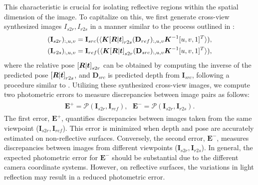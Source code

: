 This characteristic is crucial for isolating reflective regions within the spatial dimension of the image. To capitalize on this, we first generate cross-view synthesized images $I_{s2r}, I_{r2s}$ in a manner similar to the process outlined in :
\begin{align}
    (\mathbf{I}_{s2r})_{:, u, v} = \mathbf{I}_{src}(\langle {\displaystyle {\bm{K}}}{[{\displaystyle {\bm{R}}}|{\displaystyle {\bm{t}}}]}_{r2s} (\mathbf{D}_{ref})_{:,u,v} {\displaystyle {\bm{K}}}^{-1}[u,v,1]^{T}\rangle),\\
    (\mathbf{I}_{r2s})_{:, u, v} = \mathbf{I}_{ref}(\langle {\displaystyle {\bm{K}}}{[{\displaystyle {\bm{R}}}|{\displaystyle {\bm{t}}}]}_{s2r} (\mathbf{D}_{src})_{:,u,v} {\displaystyle {\bm{K}}}^{-1}[u,v,1]^{T}\rangle),
\end{align}
where the relative pose ${[{\displaystyle {\bm{R}}}|{\displaystyle {\bm{t}}}]}_{s2r}$ can be obtained by computing the inverse of the predicted pose ${[{\displaystyle {\bm{R}}}|{\displaystyle {\bm{t}}}]}_{r2s}$, and $\mathbf{D}_{src}$ is predicted depth from $\mathbf{I}_{src}$, following a procedure similar to .
Utilizing these synthesized cross-view images, we compute two photometric errors to measure discrepancies between image pairs as follows:
\begin{align}
\begin{split}
    \label{eq:photoloss}
    \mathbf{E}^{+} = \mathcal{P}(\mathbf{I}_{s2r}, \mathbf{I}_{ref}),~~~\mathbf{E}^{-} = \mathcal{P}(\mathbf{I}_{s2r}, \mathbf{I}_{r2s}).
\end{split}
\end{align}
The first error, $\mathbf{E}^{+}$, quantifies discrepancies between images taken from the same viewpoint ($\mathbf{I}_{s2r}, \mathbf{I}_{ref}$).
This error is minimized when depth and pose are accurately estimated on non-reflective surfaces.
Conversely, the second error, $\mathbf{E}^{-}$, measures discrepancies between images from different viewpoints ($\mathbf{I}_{s2r}, \mathbf{I}_{r2s}$). 
In general, the expected photometric error for $\mathbf{E}^{-}$ should be substantial due to the different camera coordinate systems. However, on reflective surfaces, the variations in light reflection may result in a reduced photometric error.
